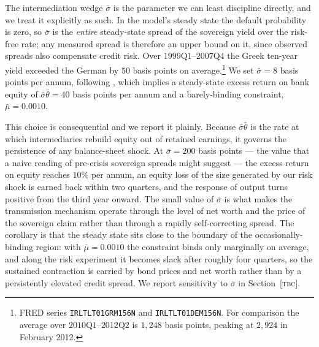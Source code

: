 The intermediation wedge $\bar\sigma$ is the parameter we can least discipline
directly, and we treat it explicitly as such. In the model's steady state the
default probability is zero, so $\bar\sigma$ is the \emph{entire} steady-state
spread of the sovereign yield over the risk-free rate; any measured spread is
therefore an upper bound on it, since observed spreads also compensate credit
risk. Over $1999\text{Q}1$--$2007\text{Q}4$ the Greek ten-year yield exceeded the
German by $50$ basis points on average.\footnote{FRED series
\texttt{IRLTLT01GRM156N} and \texttt{IRLTLT01DEM156N}. For comparison the average
over $2010\text{Q}1$--$2012\text{Q}2$ is $1{,}248$ basis points, peaking at
$2{,}924$ in February 2012.} We set $\bar\sigma=8$ basis points per annum,
following \citet{bocola2016}, which implies a steady-state excess return on bank
equity of $\bar\sigma\bar\theta=40$ basis points per annum and a barely-binding
constraint, $\bar\mu=0.0010$.

This choice is consequential and we report it plainly. Because
$\bar\sigma\bar\theta$ is the rate at which intermediaries rebuild equity out of
retained earnings, it governs the persistence of any balance-sheet shock. At
$\bar\sigma=200$ basis points --- the value that a naive reading of pre-crisis
sovereign spreads might suggest --- the excess return on equity reaches $10\%$
per annum, an equity loss of the size generated by our risk shock is earned back
within two quarters, and the response of output turns positive from the third
year onward. The small value of $\bar\sigma$ is what makes the transmission
mechanism operate through the level of net worth and the price of the sovereign
claim rather than through a rapidly self-correcting spread. The corollary is that
the steady state sits close to the boundary of the occasionally-binding region:
with $\bar\mu=0.0010$ the constraint binds only marginally on average, and along
the risk experiment it becomes slack after roughly four quarters, so the
sustained contraction is carried by bond prices and net worth rather than by a
persistently elevated credit spread. We report sensitivity to $\bar\sigma$ in
Section~[\textsc{tbc}].

